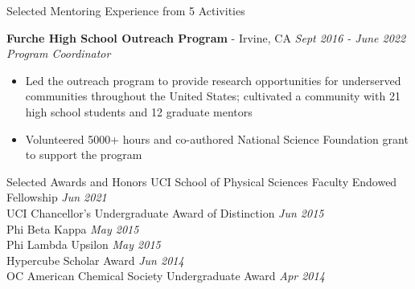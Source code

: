 \documentclass{resume} %
\begin{document}
\begin{rSection}{Selected Mentoring Experience from 5 Activities}

  {\bf Furche High School Outreach Program} - Irvine, CA \hfill {\em Sept 2016 - June 2022} \\
  {\textit{Program Coordinator}}
  \vspace{-0.5em}
  \begin{itemize}
    \itemsep-0.75em
  \item Led the outreach program to provide research opportunities for underserved communities
    throughout the United States; cultivated a community with 21 high school students and 12 graduate mentors
  \item Volunteered 5000+ hours and co-authored National Science Foundation grant to support the program
  \end{itemize}

\end{rSection}

\begin{rSection}{Selected Awards and Honors}
  UCI School of Physical Sciences Faculty Endowed Fellowship \hfill {\em Jun 2021} \\
  UCI Chancellor's Undergraduate Award of Distinction \hfill {\em Jun 2015} \\
  Phi Beta Kappa \hfill {\em May 2015} \\
  Phi Lambda Upsilon \hfill {\em May 2015} \\
  Hypercube Scholar Award \hfill {\em Jun 2014} \\
  OC American Chemical Society Undergraduate Award \hfill {\em Apr 2014}
\end{rSection}
\end{document}
